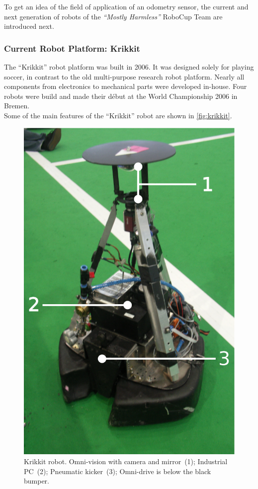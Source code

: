 \documentclass[12pt,a4paper]{article}
\newcommand{\MH}{\emph{``Mostly Harmless''} RoboCup Team\xspace}
\begin{document}
To get an idea of the field of application of an odometry sensor, the current and next generation of robots of the \MH are introduced next.



\subsubsection{Current Robot Platform: Krikkit}
\label{sec:krikkit}

The ``Krikkit'' robot platform was built in 2006. %
It was designed solely for playing soccer, in contrast to the old multi-purpose research robot platform.
Nearly all components from electronics to mechanical parts were developed in-house.
Four robots were build and made their d\'ebut at the World Championship 2006 in Bremen.\\
Some of the main features of the ``Krikkit'' robot are shown in \autoref{fig:krikkit}.

\begin{figure}[htbp]
\begin{center}
\includegraphics[width=0.5\columnwidth]{figures/krikkit.pdf}
\caption{\label{fig:krikkit}
Krikkit robot. Omni-vision with camera and mirror~(1); Industrial PC~(2); Pneumatic kicker~(3); Omni-drive is below the black bumper.
}
\end{center}
\end{figure}
\end{document}
